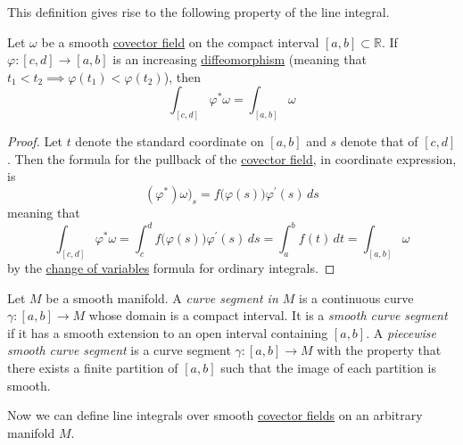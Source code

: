 \documentclass{article}
\newcounter{theorem}[section]
\newcounter{definition}[section]
\begin{document}
    This definition gives rise to the following property of the line integral. 

    \begin{theorem}
      \label{thm:diffeomorphism-invariance-of-the-integral}
    Let $\omega$ be a smooth \hyperref[def:covector-field]{covector field} on the compact interval $[a,b] \subset \mathbb{R}$. If $\varphi: [c,d] \to [a,b]$ is an increasing \hyperref[def:diffeomorphism-2]{diffeomorphism} (meaning that $t_1 < t_2 \implies \varphi(t_1) < \varphi(t_2)$), then
    \begin{equation}
      \int_{[c,d]} \varphi^* \omega = \int_{[a,b]} \omega
    \end{equation}
    \end{theorem}
    \begin{proof}
    Let $t$ denote the standard coordinate on $[a,b]$ and $s$ denote that of $[c,d]$. Then the formula for the pullback of the \hyperref[def:covector-field]{covector field}, in coordinate expression, is
    \begin{equation}
      (\varphi^*) \omega)_s = f\big(\varphi(s)\big) \varphi^\prime (s)\,ds
    \end{equation}
    meaning that 
    \begin{equation}
      \int_{[c,d]} \varphi^* \omega = \int_c^d f\big( \varphi(s) \big) \varphi^\prime (s) \,ds = \int_a^b f(t)\,dt = \int_{[a,b]} \omega
    \end{equation}
    by the \hyperref[real-thm:change-of-variable]{change of variables} formula for ordinary integrals. 
    \end{proof}

    \begin{definition}
      \label{def:curve-segment-in-m}
    Let $M$ be a smooth manifold. A \textit{curve segment in $M$} is a continuous curve $\gamma: [a,b] \to M$ whose domain is a compact interval. It is a \textit{smooth curve segment} if it has a smooth extension to an open interval containing $[a,b]$. A \textit{piecewise smooth curve segment} is a curve segment $\gamma: [a,b] \to M$ with the property that there exists a finite partition of $[a,b]$ such that the image of each partition is smooth. 
    \end{definition}

    Now we can define line integrals over smooth \hyperref[def:covector-field]{covector fields} on an arbitrary manifold $M$. 
\end{document}
